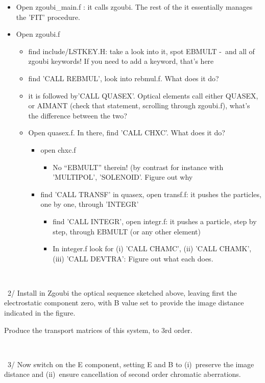 \documentclass[10pt]{article}
\newcommand{\nin}{\noindent~}
\begin{document}
\begin{itemize}
\item Open zgoubi\_main.f : it calls zgoubi. The rest of the it essentially manages the 'FIT' procedure.
\item Open zgoubi.f 
\begin{itemize}
  \item find include/LSTKEY.H: take a look into it, spot EBMULT -~and all of zgoubi keywords! If you need to add a keyword, that's here
  \item find 'CALL REBMUL', look into rebmul.f. What does it do?
  \item it is followed by'CALL QUASEX'. 
    Optical elements call either QUASEX, or AIMANT (check that statement, scrolling through zgoubi.f), what's the difference between the two? 
  \item  Open quasex.f.  In there, find 'CALL CHXC'. What does it do? 
  \begin{itemize}
    \item open chxc.f
    \begin{itemize}
      \item No ``EBMULT'' therein! (by contrast for instance with 'MULTIPOL', 'SOLENOID'.  Figure out why
    \end{itemize}
    \item find 'CALL TRANSF' in quasex, open transf.f: it pushes the particles, one by one, through 'INTEGR'
    \begin{itemize}
      \item find 'CALL INTEGR', open integr.f: it pushes a particle, step by step, 
        through EBMULT (or any other element)
      \item In integer.f look for 
        (i) 'CALL CHAMC',
          (ii) 'CALL CHAMK', 
          (iii) 'CALL DEVTRA': 
          Figure out what each does.
    \end{itemize}
  \end{itemize}
\end{itemize}
\end{itemize}

~

\nin 2/ Install in Zgoubi the optical sequence sketched above, leaving first the electrostatic component zero, with B value set 
to provide the image distance indicated in the figure.

Produce the transport matrices of this system, to 3rd order. 

~

\nin 3/ Now switch on the E component, setting  E and B to (i)~preserve the image distance and (ii)~ensure cancellation of second order chromatic aberrations.
\end{document}
